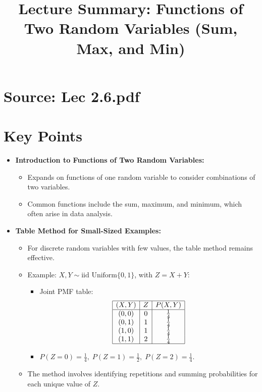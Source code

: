 \documentclass{article}
\title{Lecture Summary: Functions of Two Random Variables (Sum, Max, and Min)}
\author{}
\date{}
\begin{document}
\maketitle

\section*{Source: Lec 2.6.pdf}

\section*{Key Points}

\begin{itemize}
  \item \textbf{Introduction to Functions of Two Random Variables:}
    \begin{itemize}
      \item Expands on functions of one random variable to consider combinations of two variables.
      \item Common functions include the sum, maximum, and minimum, which often arise in data analysis.
    \end{itemize}

  \item \textbf{Table Method for Small-Sized Examples:}
    \begin{itemize}
      \item For discrete random variables with few values, the table method remains effective.
      \item Example: $X, Y \sim \text{iid Uniform}\{0, 1\}$, with $Z = X + Y$:
        \begin{itemize}
          \item Joint PMF table:
            \[
              \begin{array}{|c|c|c|c|}
                \hline
                (X, Y) & Z & P(X, Y) \\ \hline
                (0, 0) & 0 & \frac{1}{4} \\
                (0, 1) & 1 & \frac{1}{4} \\
                (1, 0) & 1 & \frac{1}{4} \\
                (1, 1) & 2 & \frac{1}{4} \\ \hline
              \end{array}
            \]
          \item $P(Z = 0) = \frac{1}{4}, \; P(Z = 1) = \frac{1}{2}, \; P(Z = 2) = \frac{1}{4}$.
        \end{itemize}
      \item The method involves identifying repetitions and summing probabilities for each unique value of $Z$.
    \end{itemize}


\end{itemize}
\end{document}
